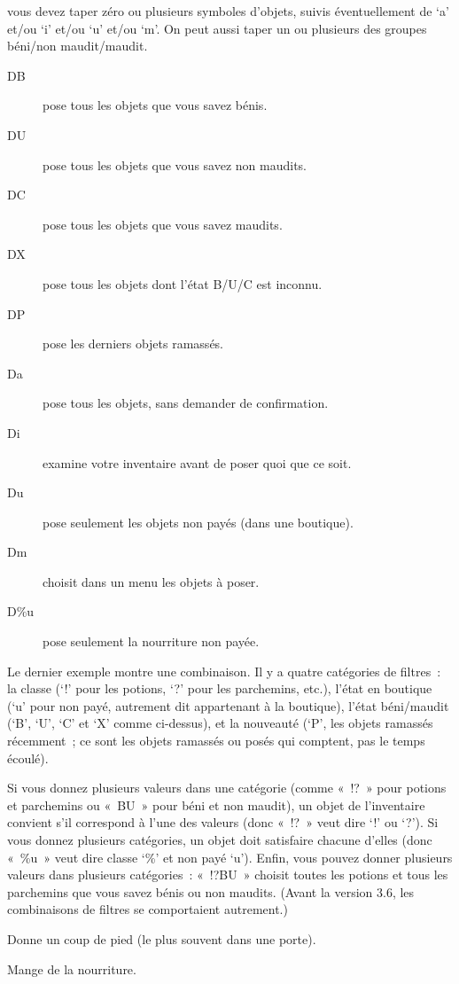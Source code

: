 \documentclass[titlepage]{article}
\begin{document}
\begin{description}
vous devez taper zéro ou plusieurs symboles d'objets, suivis
éventuellement de `a' et/ou `i' et/ou `u' et/ou
`m'.
On peut aussi taper un ou plusieurs des groupes béni/non maudit/maudit.
\begin{description}
\item[{DB}]
pose tous les objets que vous savez bénis.
\item[{DU}]
pose tous les objets que vous savez non maudits.
\item[{DC}]
pose tous les objets que vous savez maudits.
\item[{DX}]
pose tous les objets dont l'état B/U/C est inconnu.
\item[{DP}]
pose les derniers objets ramassés.
\item[{Da}]
pose tous les objets, sans demander de confirmation.
\item[{Di}]
examine votre inventaire avant de poser quoi que ce soit.
\item[{Du}]
pose seulement les objets non payés (dans une boutique).
\item[{Dm}]
choisit dans un menu les objets à poser.
\item[{D\%u}]
pose seulement la nourriture non payée.
\end{description}
Le dernier exemple montre une combinaison.
Il y a quatre catégories de filtres~: la classe (`!' pour les
potions, `?' pour les parchemins, etc.), l'état en boutique
(`u' pour non payé, autrement dit appartenant à la boutique), l'état
béni/maudit (`B', `U', `C' et `X' comme ci-dessus),
et la nouveauté (`P', les objets ramassés récemment~; ce sont les
objets ramassés ou posés qui comptent, pas le temps écoulé).


Si vous donnez plusieurs valeurs dans une catégorie (comme «~!?~»
pour potions et parchemins ou «~BU~» pour béni et non maudit), un
objet de l'inventaire convient s'il correspond à l'une des valeurs (donc
«~!?~» veut dire `!' ou `?').
Si vous donnez plusieurs catégories, un objet doit satisfaire chacune
d'elles (donc «~\%u~» veut dire classe `\%' et non payé
`u').
Enfin, vous pouvez donner plusieurs valeurs dans plusieurs catégories~:
«~!?BU~» choisit toutes les potions et tous les parchemins que vous
savez bénis ou non maudits.
(Avant la version 3.6, les combinaisons de filtres se comportaient
autrement.)

\item[{\textasciicircum{}D}]
Donne un coup de pied (le plus souvent dans une porte).

\item[{e}]
Mange de la nourriture.



\end{description}
\end{document}
